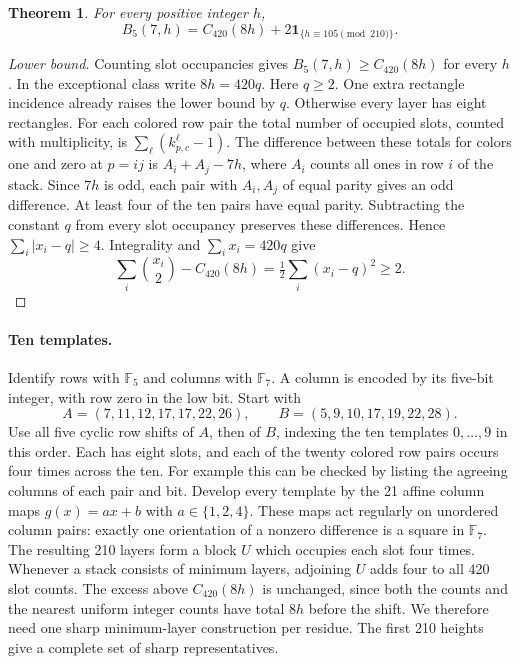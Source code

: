 \documentclass[11pt]{article}
\newtheorem{theorem}{Theorem}
\newcommand{\one}{\mathbf 1}
\newcommand{\F}{\mathbb F}
\begin{document}
\begin{theorem}\label{t:57}
For every positive integer $h$,
\[
 B_5(7,h)=C_{420}(8h)+2\one_{\{h\equiv105\pmod{210}\}} .
\]
\end{theorem}
\begin{proof}[Lower bound]
Counting slot occupancies gives $B_5(7,h)\ge C_{420}(8h)$ for every $h$. In the exceptional class write $8h=420q$. Here $q\ge2$. One extra rectangle incidence already raises the lower bound by $q$. Otherwise every layer has eight rectangles. For each colored row pair the total number of occupied slots, counted with multiplicity, is $\sum_\ell(k_{p,c}^{\ell}-1)$. The difference between these totals for colors one and zero at $p=ij$ is $A_i+A_j-7h$, where $A_i$ counts all ones in row $i$ of the stack. Since $7h$ is odd, each pair with $A_i,A_j$ of equal parity gives an odd difference. At least four of the ten pairs have equal parity. Subtracting the constant $q$ from every slot occupancy preserves these differences. Hence $\sum_i|x_i-q|\ge4$. Integrality and $\sum_i x_i=420q$ give
\[
 \sum_i\binom{x_i}{2}-C_{420}(8h)=\tfrac12\sum_i(x_i-q)^2\ge2 .
\]
\end{proof}

\paragraph{Ten templates.}
Identify rows with $\F_5$ and columns with $\F_7$. A column is encoded by its five-bit integer, with row zero in the low bit. Start with
\[
 A=(7,11,12,17,17,22,26),\qquad B=(5,9,10,17,19,22,28).
\]
Use all five cyclic row shifts of $A$, then of $B$, indexing the ten templates $0,\ldots,9$ in this order. Each has eight slots, and each of the twenty colored row pairs occurs four times across the ten. For example this can be checked by listing the agreeing columns of each pair and bit. Develop every template by the 21 affine column maps $g(x)=ax+b$ with $a\in\{1,2,4\}$. These maps act regularly on unordered column pairs: exactly one orientation of a nonzero difference is a square in $\F_7$. The resulting 210 layers form a block $U$ which occupies each slot four times. Whenever a stack consists of minimum layers, adjoining $U$ adds four to all 420 slot counts. The excess above $C_{420}(8h)$ is unchanged, since both the counts and the nearest uniform integer counts have total $8h$ before the shift. We therefore need one sharp minimum-layer construction per residue. The first 210 heights give a complete set of sharp representatives.
\end{document}
